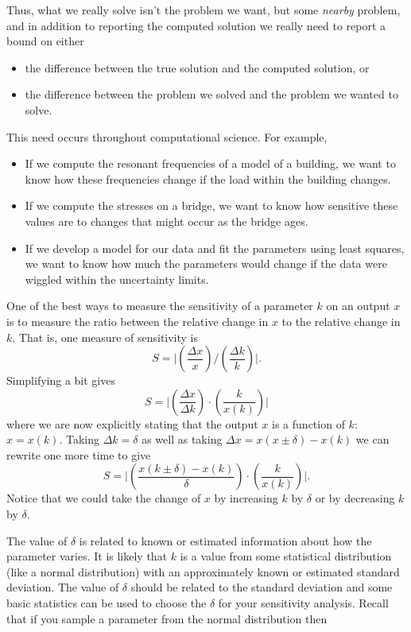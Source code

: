\documentclass[
]{book}
\theoremstyle{definition}
\theoremstyle{definition}
\theoremstyle{definition}
\theoremstyle{remark}
\begin{document}
Thus, what we really solve isn't the problem we want, but some \emph{nearby}
problem, and in addition to reporting the computed solution we really
need to report a bound on either

\begin{itemize}
\item
  the difference between the true solution and the computed solution,
  or
\item
  the difference between the problem we solved and the problem we
  wanted to solve.
\end{itemize}

This need occurs throughout computational science. For example,

\begin{itemize}
\item
  If we compute the resonant frequencies of a model of a building, we
  want to know how these frequencies change if the load within the
  building changes.
\item
  If we compute the stresses on a bridge, we want to know how
  sensitive these values are to changes that might occur as the bridge
  ages.
\item
  If we develop a model for our data and fit the parameters using
  least squares, we want to know how much the parameters would change
  if the data were wiggled within the uncertainty limits.
\end{itemize}

One of the best ways to measure the sensitivity of a parameter \(k\) on an
output \(x\) is to measure the ratio between the relative change in \(x\) to
the relative change in \(k\). That is, one measure of sensitivity is
\[S = \Big| \left( \frac{\Delta x}{x} \right) \Big/ \left( \frac{\Delta k}{k} \right)
    \Big|.\] Simplifying a bit gives
\[S = \Big| \left( \frac{\Delta x}{\Delta k} \right) \cdot \left( \frac{k}{x(k)} \right)
    \Big|\] where we are now explicitly stating that the output \(x\) is a
function of \(k\): \(x=x(k)\). Taking \(\Delta k = \delta\) as well as taking
\(\Delta x = x(x\pm\delta)-x(k)\) we can rewrite one more time to give
\[S = \Big|\left( \frac{x(k\pm\delta)-x(k)}{\delta} \right) \cdot \left( \frac{k}{x(k)}
    \right) \Big|.\] Notice that we could take the change of \(x\) by
increasing \(k\) by \(\delta\) or by decreasing \(k\) by \(\delta\).

The value of \(\delta\) is related to known or estimated information about
how the parameter varies. It is likely that \(k\) is a value from some
statistical distribution (like a normal distribution) with an
approximately known or estimated standard deviation. The value of
\(\delta\) should be related to the standard deviation and some basic
statistics can be used to choose the \(\delta\) for your sensitivity
analysis. Recall that if you sample a parameter from the normal
distribution then
\end{document}

